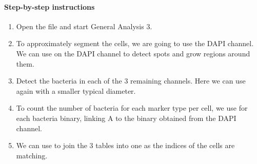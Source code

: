 \paragraph{Step-by-step instructions}
\begin{enumerate}
    \item Open the file  and start General Analysis 3.
    \item To approximately segment the cells, we are going to use the DAPI channel. We can use   on the DAPI channel to detect spots and grow regions around them.
    \item Detect the bacteria in each of the 3 remaining channels. Here we can use  again with a smaller typical diameter.
    \item To count the number of bacteria for each marker type per cell, we use  for each bacteria binary, linking A to the binary obtained from the DAPI channel.
    \item We can use  to join the 3 tables into one as the indices of the cells are matching.
\end{enumerate}

